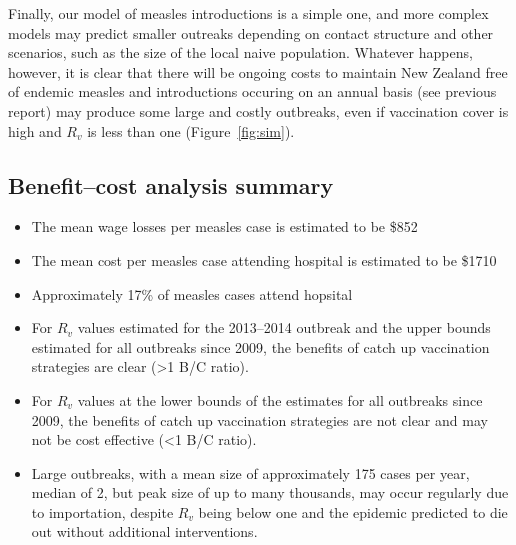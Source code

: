 \documentclass{article}
\begin{document}
Finally, our model of measles introductions is a simple one, and more complex models may predict smaller outreaks depending on contact structure and other scenarios, such as the size of the local naive population. Whatever happens, however, it is clear that there will be ongoing costs to maintain New Zealand free of endemic measles and introductions occuring on an annual basis (see previous report) may produce some large and costly outbreaks, even if vaccination cover is high and $R_v$ is less than one (Figure~\ref{fig:sim}).

\subsection{Benefit--cost analysis summary}
\begin{itemize}
\item The mean wage losses per measles case is estimated to be \$852
\item The mean cost per measles case attending hospital is estimated to be \$1710
\item Approximately 17\% of measles cases attend hopsital
\item For $R_v$ values estimated for the 2013--2014 outbreak and the upper bounds estimated for all outbreaks since 2009, the benefits of catch up vaccination strategies are clear (>1 B/C ratio).
\item For $R_v$ values at the lower bounds of the estimates for all outbreaks since 2009, the benefits of catch up vaccination strategies are not clear and may not be cost effective (<1 B/C ratio).
\item Large outbreaks, with a mean size of approximately 175 cases per year, median of 2, but peak size of up to many thousands, may occur regularly due to importation, despite $R_v$ being below one and the epidemic predicted to die out without additional interventions.
\end{itemize}
\end{document}
